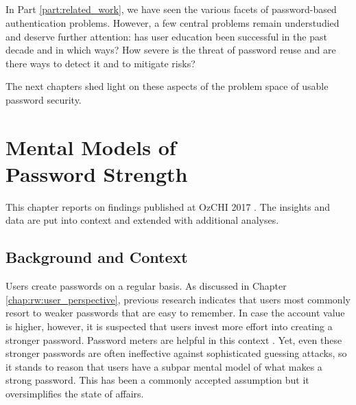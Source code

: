 \section*{}
In Part \ref{part:related_work}, we have seen the various facets of password-based authentication problems. However, a few central problems remain understudied and deserve further attention: has user education been successful in the past decade and in which ways? How severe is the threat of password reuse and are there ways to detect it and to mitigate risks? 

The next chapters shed light on these aspects of the problem space of usable password security. 

\chapter[Mental Models of Password Strength]{Mental Models of \\
	Password Strength}\label{chap:pasdjo}

This chapter reports on findings published at OzCHI 2017 \cite{Seitz2017PASDJO}. The insights and data are put into context and extended with additional analyses. 

\section{Background and Context}
Users create passwords on a regular basis. As discussed in Chapter \ref{chap:rw:user_perspective}, previous research indicates that users most commonly resort to weaker passwords that are easy to remember. In case the account value is higher, however, it is suspected that users invest more effort into creating a stronger password. Password meters are helpful in this context \cite{Egelman2013DoesMyPasswordGoUpToEleven}. Yet, even these stronger passwords are often ineffective against sophisticated guessing attacks, so it stands to reason that users have a subpar mental model of what makes a strong password. This has been a commonly accepted assumption \ar but it oversimplifies the state of affairs. 

